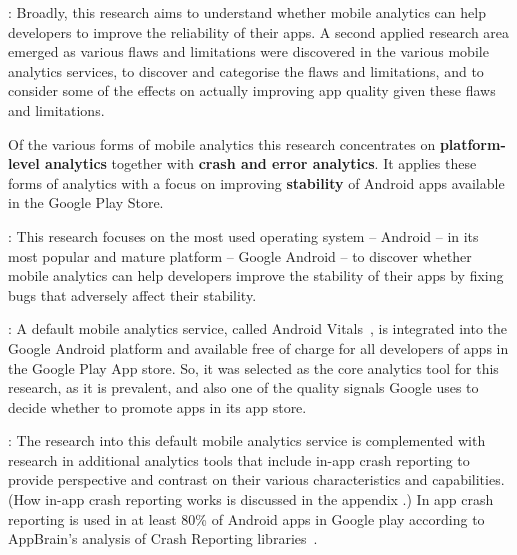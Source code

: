 : Broadly, this research aims to understand whether mobile analytics can help developers to improve the reliability of their apps. A second applied research area emerged as various flaws and limitations were discovered in the various mobile analytics services, to discover and categorise the flaws and limitations, and to consider some of the effects on actually improving app quality given these flaws and limitations.

Of the various forms of mobile analytics this research concentrates on \textbf{platform-level analytics} together with \textbf{crash and error analytics}. It applies these forms of analytics with a focus on improving \textbf{stability} of Android apps available in the Google Play Store.

: This research focuses on the most used operating system -- Android -- in its most popular and mature platform -- Google Android -- to discover whether mobile analytics can help developers improve the stability of their apps by fixing bugs that adversely affect their stability. 

: A default mobile analytics service, called Android Vitals~, is integrated into the Google Android platform and available free of charge for all developers of apps in the Google Play App store. So, it was selected as the core analytics tool for this research, as it is prevalent, and also one of the quality signals Google uses to decide whether to promote apps in its app store. %

: The research into this default mobile analytics service is complemented with research in additional analytics tools that include in-app crash reporting to provide perspective and contrast on their various characteristics and capabilities. (How in-app crash reporting works is discussed in the appendix \href{{app:crash-recording-and-reporting-in-android}}{}.) In app crash reporting is used in at least 80\% of Android apps in Google play according to AppBrain's analysis of Crash Reporting libraries~.

